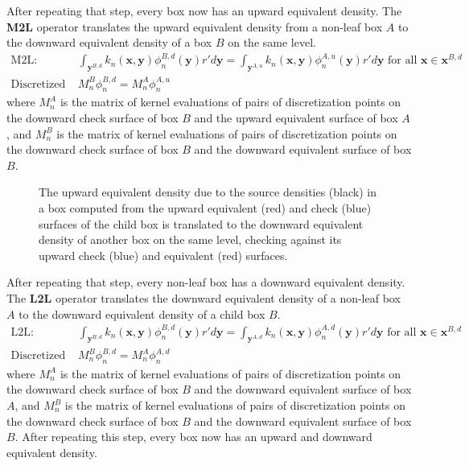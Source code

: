 \documentclass[11pt, oneside]{article}   	%
\begin{document}
After repeating that step, every box now has an upward equivalent density. The \textbf{M2L} operator translates the upward equivalent density from a non-leaf box $A$ to the downward equivalent density of a box $B$ on the same level.
\begin{align}
\mbox{M2L: }&\int_{\mathbf{y}^{B,d}}{k_n(\mathbf{x},\mathbf{y})}\phi^{B,d}_n{(\mathbf{y})}r'd\mathbf{y} = \int_{\mathbf{y}^{A,u}}{k_n(\mathbf{x},\mathbf{y})}\phi^{A,u}_n{(\mathbf{y})}r'd\mathbf{y}\mbox{ for all }\mathbf{x}\in\mathbf{x}^{B,d}\\
\mbox{Discretized M2L: }&M_n^B\phi^{B,d}_n=M_n^A\phi^{A,u}_n
\end{align}
where $M_n^A$ is the matrix of kernel evaluations of pairs of discretization points on the downward check surface of box $B$ and the upward equivalent surface of box $A$, and $M_n^B$ is the matrix of kernel evaluations of pairs of discretization points on the downward check surface of box $B$ and the downward equivalent surface of box $B$.

\begin{figure}[!ht]
\begin{center}
\end{center}
\caption{The upward equivalent density due to the source densities (black) in a box computed from the upward equivalent (red) and check (blue) surfaces of the child box is translated to the downward equivalent density of another box on the same level, checking against its upward check (blue) and equivalent (red) surfaces.}
\end{figure}

After repeating that step, every non-leaf box has a downward equivalent density. The \textbf{L2L} operator translates the downward equivalent density of a non-leaf box $A$ to the downward equivalent density of a child box $B$.
\begin{align}
\mbox{L2L: }&\int_{\mathbf{y}^{B,d}}{k_n(\mathbf{x},\mathbf{y})}\phi^{B,d}_n{(\mathbf{y})}r'd\mathbf{y}=\int_{\mathbf{y}^{A,d}}{k_n(\mathbf{x},\mathbf{y})}\phi^{A,d}_n{(\mathbf{y})}r'd\mathbf{y}\mbox{ for all }\mathbf{x}\in\mathbf{x}^{B,d}\\
\mbox{Discretized L2L: }&M_n^B\phi^{B,d}_n=M_n^A\phi^{A,d}_n
\end{align}
where $M_n^A$ is the matrix of kernel evaluations of pairs of discretization points on the downward check surface of box $B$ and the downward equivalent surface of box $A$, and $M_n^B$ is the matrix of kernel evaluations of pairs of discretization points on the downward check surface of box $B$ and the downward equivalent surface of box $B$. After repeating this step, every box now has an upward and downward equivalent density.
\end{document}
